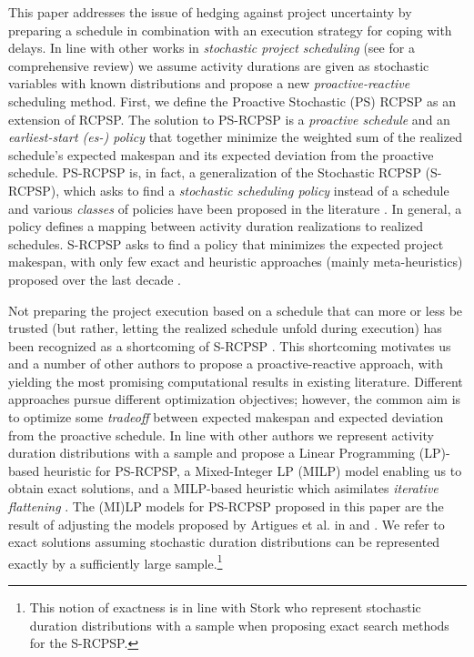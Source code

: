 	This paper addresses the issue of hedging against project uncertainty 
 	by preparing a schedule in combination with an execution strategy for coping with delays.
	In line with other works in \emph{stochastic project scheduling} 
	(see \cite{herroelen2004robust} for a comprehensive review)
	we assume activity durations are given as stochastic variables with known distributions
	and propose a new \emph{proactive-reactive} scheduling method.
	First, we define the Proactive Stochastic (PS) RCPSP as an extension of RCPSP.
	The solution to PS-RCPSP is a \emph{proactive schedule} and an \emph{earliest-start (es-) policy}
	that together minimize the weighted sum of the realized schedule's expected makespan 
	and its expected deviation from the proactive schedule.
	PS-RCPSP is, in fact, a generalization of the Stochastic RCPSP (S-RCPSP),
	which asks to find a \emph{stochastic scheduling policy} instead of a schedule
	and various \emph{classes} of policies have been proposed in the literature 
	\cite{mohring1984stochastic,mohring1985stochastic,herroelen2004robust}.
	In general, a  policy defines a mapping between activity duration realizations to realized schedules.
	S-RCPSP asks to find a policy that minimizes the expected project makespan,
	with only few exact and heuristic approaches (mainly meta-heuristics) proposed over the last decade
	\cite{stork2000branch,ballestin2007worthwhile,ballestin2009resource,ashtiani2011new}.	
	
	Not preparing the project execution based on a schedule that can more or less be trusted
	(but rather, letting the realized schedule unfold during execution) 
	has been recognized as a shortcoming of S-RCPSP \cite{herroelen2004construction}.
	This shortcoming motivates us and a number of 
	other authors to propose a proactive-reactive approach,
	with \cite{van2008,deblaere2011proactive,lamas2015}
	yielding the most promising computational results in existing literature.
	Different approaches pursue different optimization objectives;
	however, the common aim is to optimize some \emph{tradeoff} between expected makespan 
	and expected deviation from the proactive schedule.
 	In line with other authors we represent activity duration distributions with a sample
 	and propose a Linear Programming (LP)-based heuristic for PS-RCPSP,
 	a Mixed-Integer LP (MILP) model enabling us to obtain exact solutions, and
 	a MILP-based heuristic which asimilates \emph{iterative flattening} \cite{oddi2009iterative}.
   	The (MI)LP models for PS-RCPSP proposed in this paper are the 
 	result of adjusting the models proposed by Artigues et al. in
 	\cite{artigues2003insertion} and \cite{leus2011robust}.	
 	We refer to exact solutions assuming stochastic duration distributions 
 	can be represented exactly by a sufficiently large sample.\footnote{
 	This notion of exactness is in line with Stork \cite{stork2000branch} who 
 	represent stochastic duration distributions with a sample
 	when proposing exact search methods for the S-RCPSP.}
 	
